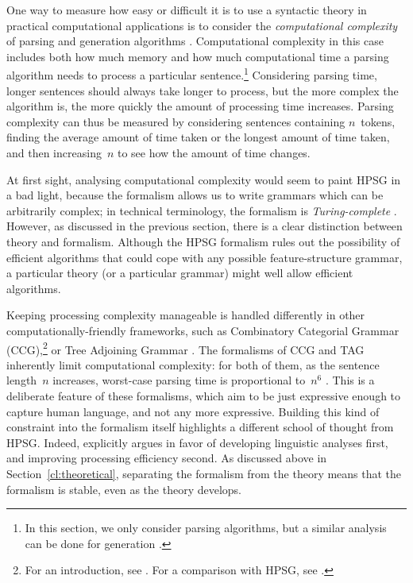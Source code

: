 \documentclass[output=paper,nonflat]{langsci/langscibook}
\begin{document}
One way to measure how easy or difficult it is
to use a syntactic theory in practical computational applications
is to consider the \textit{computational complexity}
of parsing and generation algorithms \citep{gazdar1985complexity}.
Computational complexity in this case includes both how much
memory and how much computational time 
a parsing algorithm needs to process a particular sentence.\footnote{%
  In this section, we only consider parsing
  algorithms, but a similar analysis can be done for generation
  \citep[\eg][]{carroll1999generate}.}
Considering parsing time, longer sentences should always take longer to process,
but the more complex the algorithm is,
the more quickly the amount of processing time increases.
Parsing complexity can thus be measured by considering sentences containing $n$~tokens,
finding the average amount of time taken or the longest amount of time taken,
and then increasing~$n$ to see how the amount of time changes.

At first sight, analysing computational complexity
would seem to paint HPSG in a bad light,
because the formalism allows us to write grammars
which can be arbitrarily complex;
in technical terminology, the formalism is \textit{Turing-complete}
\citep[Section~3.4]{Johnson88}.
However, as discussed in the previous section,
there is a clear distinction between theory and formalism.
Although the HPSG formalism rules out the possibility of efficient algorithms
that could cope with any possible feature-structure grammar,
a particular theory (or a particular grammar) might well allow efficient algorithms.

Keeping processing complexity manageable is handled differently
in other computationally-friendly frameworks,
such as Combinatory Categorial Grammar (CCG),\footnote{%
	For an introduction, see \citet{steedman2011ccg}.
	For a comparison with HPSG, see .
}
or Tree Adjoining Grammar \citep[TAG;][]{Joshi87a-u,SAJ88a-u}.
The formalisms of CCG and TAG inherently limit computational complexity:
for both of them, as the sentence length~$n$ increases,
worst-case parsing time is proportional to~$n^6$ \citep{Kasamietal1989}.
This is a deliberate feature of these formalisms,
which aim to be just expressive enough to capture human language,
and not any more expressive.
Building this kind of constraint into the formalism itself
highlights a different school of thought from HPSG.
Indeed, \citet{MuellerCoreGram} explicitly argues
in favor of developing linguistic analyses first,
and improving processing efficiency second.
As discussed above in Section~\ref{cl:theoretical},
separating the formalism from the theory
means that the formalism is stable, even as the theory develops.
\end{document}
